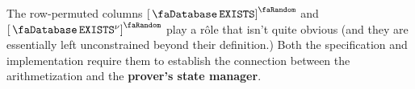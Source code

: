 \saNote{}
The row-permuted columns
$\order{\accExists}$ and
$\order{\accExists\new}$
play a rôle that isn't quite obvious (and they are essentially left unconstrained beyond their definition.)
Both the specification and implementation require them to establish the connection between the arithmetization and the \textbf{prover's state manager}.
